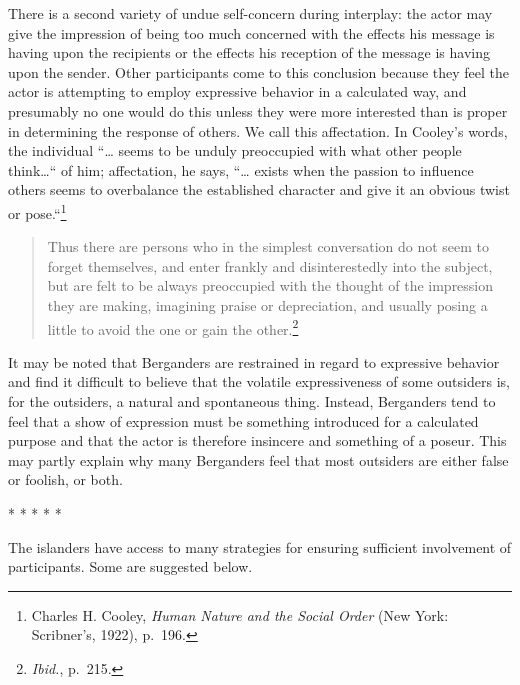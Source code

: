 \documentclass[openany,nobib]{tufte-book}
\begin{document}
There is a second variety of undue self-concern during interplay: the
actor may give the impression of being too much concerned with the
effects his message is having upon the recipients or the effects his
reception of the message is having upon the sender. Other participants
come to this conclusion because they feel the actor is attempting to
employ expressive behavior in a calculated way, and presumably no one
would do this unless they were more interested than is proper in
determining the response of others. We call this affectation. In
Cooley's words, the individual ``\ldots{} seems to be unduly preoccupied
with what other people think\ldots`` of him; affectation, he says,
``\ldots{} exists when the passion to influence others seems to\newpage\noindent
overbalance the established character and give it an obvious twist or
pose.``\footnote{Charles H. Cooley, \emph{Human Nature and the Social
  Order} (New York: Scribner's, 1922), p.~196.}

\begin{quote}
Thus there are persons who in the simplest conversation do not seem to
forget themselves, and enter frankly and disinterestedly into the
subject, but are felt to be always preoccupied with the thought of the
impression they are making, imagining praise or depreciation, and
usually posing a little to avoid the one or gain the other.\footnote{\emph{Ibid.},
  p.~215.}
\end{quote}

\noindent It may be noted that Berganders are restrained in regard to expressive
behavior and find it difficult to believe that the volatile
expressiveness of some outsiders is, for the outsiders, a natural and
spontaneous thing. Instead, Berganders tend to feel that a show of
expression must be something introduced for a calculated purpose and
that the actor is therefore insincere and something of a poseur. This
may partly explain why many Berganders feel that most outsiders are
either false or foolish, or both.

\vspace{.2in}
\begin{centering}

\Large{* * * * *}

\end{centering}
\vspace{.17in}

\noindent The islanders have access to many strategies for ensuring sufficient
involvement of participants. Some are suggested below.
\end{document}
